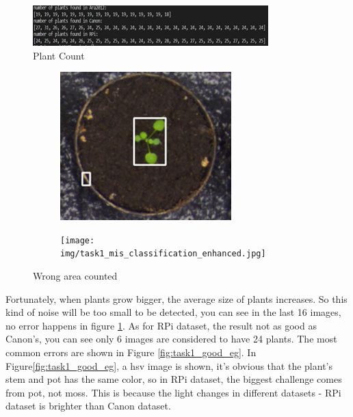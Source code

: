 \documentclass[conference]{IEEEtran}
\begin{document}
\begin{figure}[h!]
\centering
\includegraphics[width=0.9\linewidth]{img/task1_plant_count.png}
\caption{Plant Count}
\label{task1_plant_count}
\end{figure}
\begin{figure}[h!]
\centering
\begin{subfigure}[h!]{0.24\textwidth}
    \centering
    \includegraphics[width=\textwidth]{img/task1_mis_classification.png}
\end{subfigure}
\hfill
\begin{subfigure}[h!]{0.24\textwidth}
    \centering
    \texttt{[image: img/task1\_mis\_classification\_enhanced.jpg]}
\end{subfigure}
\caption{Wrong area counted}
\label{fig:task1_eg_mis_class}
\end{figure}

Fortunately, when plants grow bigger, the average size of plants increases. So this kind of noise will be too small to be detected, you can see in the last 16 images, no error happens in figure \ref{task1_plant_count}.  
	As for RPi dataset, the result not as good as Canon’s, you can see only 6 images are considered to have 24 plants. The most common errors are shown in Figure \ref{fig:task1_good_eg}. In Figure\ref{fig:task1_good_eg}, a hsv image is shown, it’s obvious that the plant’s stem and pot has the same color, so in RPi dataset, the biggest challenge comes from pot, not moss. This is because the light changes in different datasets - RPi dataset is brighter than Canon dataset. 
    
\end{document}
